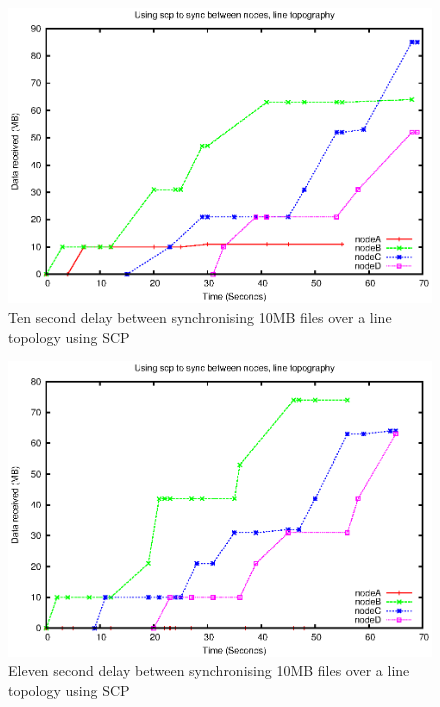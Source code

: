 \documentclass[12pt]{article}
\begin{document}
\begin{figure}[hb!]
\centering
\includegraphics[height=0.4\textheight]{images/line-scp-10-10.eps}
\caption{Ten second delay between synchronising 10MB files over a line topology
using SCP}
\label{fig:line_scp_10_10}
\end{figure}

\newpage
\begin{figure}[ht!]
\centering
\includegraphics[height=0.4\textheight]{images/line-scp-10-11.eps}
\caption{Eleven second delay between synchronising 10MB files over a line topology
using SCP}
\label{fig:line_scp_10_11}
\end{figure}
\end{document}

